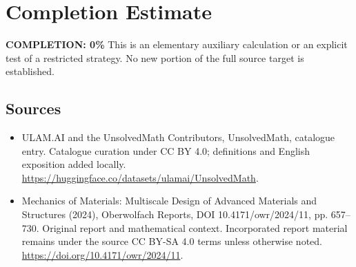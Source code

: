 \documentclass[11pt]{article}
\begin{document}
\section{Completion Estimate}
\noindent\textbf{COMPLETION: 0\%}
This is an elementary auxiliary calculation or an explicit test of a restricted strategy. No new portion of the full source target is established.

\subsection{Sources}
\begin{itemize}
\item[\hypertarget{source:statement:1}{S1}] ULAM.AI and the UnsolvedMath Contributors, UnsolvedMath, catalogue entry. Catalogue curation under CC BY 4.0; definitions and English exposition added locally.
\url{https://huggingface.co/datasets/ulamai/UnsolvedMath}.
\item[\hypertarget{source:statement:2}{S2}] Mechanics of Materials: Multiscale Design of Advanced Materials and Structures (2024), Oberwolfach Reports, DOI 10.4171/owr/2024/11, pp. 657--730. Original report and mathematical context. Incorporated report material remains under the source CC BY-SA 4.0 terms unless otherwise noted.
\url{https://doi.org/10.4171/owr/2024/11}.
\end{itemize}
\label{end:statement}
\end{document}
